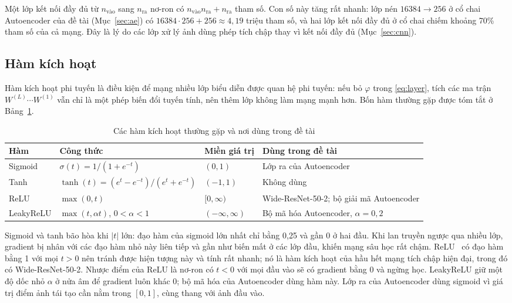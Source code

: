 Một lớp kết nối đầy đủ từ $n_{\text{vào}}$ sang $n_{\text{ra}}$ nơ-ron có $n_{\text{vào}} n_{\text{ra}} + n_{\text{ra}}$
tham số. Con số này tăng rất nhanh: lớp nén $16384 \to 256$ ở cổ chai Autoencoder của đề tài (Mục~\ref{sec:ae}) có
$16384 \cdot 256 + 256 \approx 4{,}19$ triệu tham số, và hai lớp kết nối đầy đủ ở cổ chai chiếm khoảng 70\% tham số
của cả mạng. Đây là lý do các lớp xử lý ảnh dùng phép tích chập thay vì kết nối đầy đủ (Mục~\ref{sec:cnn}).

\subsection{Hàm kích hoạt}

Hàm kích hoạt phi tuyến là điều kiện để mạng nhiều lớp biểu diễn được quan hệ phi tuyến: nếu bỏ $\varphi$ trong
\eqref{eq:layer}, tích các ma trận $W^{(L)}\cdots W^{(1)}$ vẫn chỉ là một phép biến đổi tuyến tính, nên thêm lớp không
làm mạng mạnh hơn. Bốn hàm thường gặp được tóm tắt ở Bảng~\ref{tab:activation}.

\begin{table}[htbp]
  \centering
  \caption{Các hàm kích hoạt thường gặp và nơi dùng trong đề tài}
  \label{tab:activation}
  \small
  \begin{tabular}{@{}l l l >{\raggedright\arraybackslash}p{5.2cm}@{}}
    \toprule
    Hàm & Công thức & Miền giá trị & Dùng trong đề tài \\
    \midrule
    Sigmoid & $\sigma(t) = 1/(1+e^{-t})$ & $(0, 1)$ & Lớp ra của Autoencoder \\
    Tanh & $\tanh(t) = (e^{t}-e^{-t})/(e^{t}+e^{-t})$ & $(-1, 1)$ & Không dùng \\
    ReLU & $\max(0, t)$ & $[0, \infty)$ & Wide-ResNet-50-2; bộ giải mã Autoencoder \\
    LeakyReLU & $\max(t, \alpha t)$, $0<\alpha<1$ & $(-\infty, \infty)$ & Bộ mã hóa Autoencoder, $\alpha = 0{,}2$ \\
    \bottomrule
  \end{tabular}
\end{table}

Sigmoid và tanh bão hòa khi $|t|$ lớn: đạo hàm của sigmoid lớn nhất chỉ bằng 0,25 và gần 0 ở hai đầu. Khi lan truyền
ngược qua nhiều lớp, gradient bị nhân với các đạo hàm nhỏ này liên tiếp và gần như biến mất ở các lớp đầu, khiến
mạng sâu học rất chậm. ReLU~\cite{nairRectifiedLinearUnits2010} có đạo hàm bằng 1 với mọi $t>0$ nên tránh được hiện
tượng này và tính rất nhanh; nó là hàm kích hoạt của hầu hết mạng tích chập hiện đại, trong đó có Wide-ResNet-50-2.
Nhược điểm của ReLU là nơ-ron có $t<0$ với mọi đầu vào sẽ có gradient bằng 0 và ngừng học. LeakyReLU giữ một độ dốc
nhỏ $\alpha$ ở nửa âm để gradient luôn khác 0; bộ mã hóa của Autoencoder dùng hàm này. Lớp ra của Autoencoder dùng
sigmoid vì giá trị điểm ảnh tái tạo cần nằm trong $[0,1]$, cùng thang với ảnh đầu vào.

